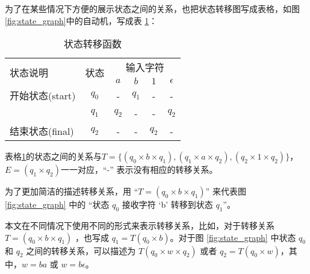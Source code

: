 \begin{remark}
    为了在某些情况下方便的展示状态之间的关系，也把状态转移图写成表格\cite{book1}，如图\ref{fig:state_graph}中的自动机，写成表 \ref{tab:sample}：
\begin{table}[!htbp]
    \caption{状态转移函数}
    \label{tab:sample}
    \centering
    \small%
    \setlength{\tabcolsep}{6pt}%
    \renewcommand{\arraystretch}{1.2}%
    \begin{tabular}{lccccc}
        \toprule%
        \multirow{2}{*}{状态说明} & \multirow{2}{*}{状态} & \multicolumn{4}{c}{输入字符} \\
		\cline{3-6}      &    &$a$ & $b$ & $1$ & $\epsilon$ \\
        \midrule%
        开始状态(start)  & $q_0$ & -     & $q_1$  &      - &     -    \\
                        & $q_1$ & $q_2$ &    -   &    -   &    $q_2$ \\
        结束状态(final) & $q_2$ &   -   & -      & $q_2$  &    -     \\
        \bottomrule%
    \end{tabular}
\end{table}
\end{remark}


表格\ref{tab:sample}的状态之间的关系与$T=\{(q_0 \times b \times q_1),(q_1\times a \times q_2),(q_2\times 1 \times q_2)\}$，$E=(q_1 \times q_2)$一一对应，“\mbox{-}” 表示没有相应的转移关系。%

\begin{remark}[转移关系的表示]
    为了更加简洁的描述转移关系，用 “$T=(q_0 \times b \times q_1)$” 来代表图 \ref{fig:state_graph} 中的 “状态 $q_0$ 接收字符 ‘b’ 转移到状态 $q_1$”。
\end{remark}

\begin{remark}
    本文在不同情况下使用不同的形式来表示转移关系，比如，对于转移关系 $T=(q_0 \times b \times q_1)$ ，也写成 $ q_1 = T(q_0 \times b) $。对于图 \ref{fig:state_graph} 中状态 $q_0$ 和 $q_2$ 之间的转移关系，可以描述为 $T(q_0\times w \times q_2)$ 或者 $q_2=T(q_0 \times w)$，其中，$w=ba$ 或 $w=b\epsilon$。
\end{remark}

